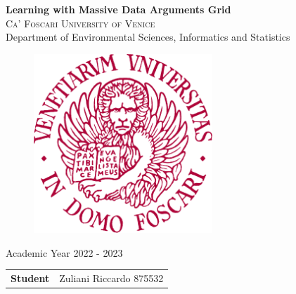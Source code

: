 \begin{titlepage}
    \vspace*{1 cm}
    \begin{center}
         {\LARGE \textbf{Learning with Massive Data Arguments Grid}\\}
        \vspace{2 cm}
        \textsc{Ca' Foscari University of Venice}\\
        Department of Environmental Sciences, Informatics and Statistics\\
        \vspace{0.2 cm}
        \begin{figure}[h!]
        	\centering
        	\includegraphics[width=0.6\textwidth]{logo} 
        \end{figure}
        Academic Year 2022 - 2023\\
        \vspace{3.0 cm}
        	
        \begin{flushleft}
        	\begin{tabular}{l l}
        		\textbf{Student} & Zuliani Riccardo 875532\\
        	\end{tabular}
        \end{flushleft}
    \end{center}
\end{titlepage}

